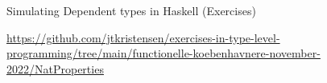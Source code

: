 \documentclass[dvipsnames]{beamer}
\begin{document}

\begin{frame}{Simulating Dependent types in Haskell (Exercises)}
  \begin{center}
\url{https://github.com/jtkristensen/exercises-in-type-level-programming/tree/main/functionelle-koebenhavnere-november-2022/NatProperties}
  \end{center}
\end{frame}

\end{document}
